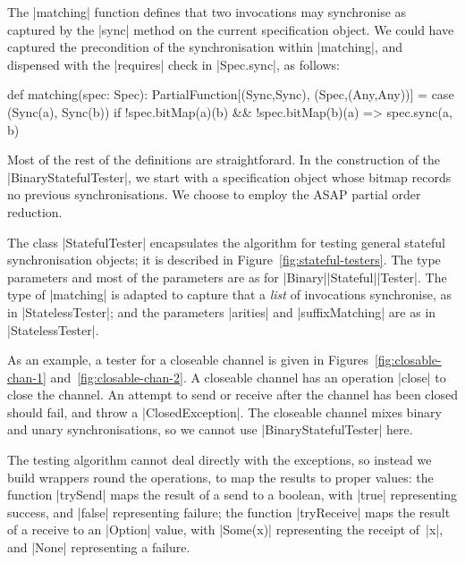 The |matching| function defines that two invocations may synchronise as
captured by the |sync| method on the current specification object.  We could
have captured the precondition of the synchronisation within |matching|, and
dispensed with the |requires| check in |Spec.sync|, as follows:
%
\begin{scala}
  def matching(spec: Spec): PartialFunction[(Sync,Sync), (Spec,(Any,Any))] = {
    case (Sync(a), Sync(b)) if !spec.bitMap(a)(b) && !spec.bitMap(b)(a) => 
      spec.sync(a, b) 
  }
\end{scala}

Most of the rest of the definitions are straightforard.  In the construction
of the |BinaryStatefulTester|, we start with a specification object whose
bitmap records no previous synchronisations.  We choose to employ the ASAP
partial order reduction.



The class |StatefulTester| encapsulates the algorithm for testing general
stateful synchronisation objects; it is described in
Figure~\ref{fig:stateful-testers}.  The type parameters and most of the
parameters are as for |Binary|\-|Stateful|\-|Tester|.  The type of |matching|
is adapted to capture that a \emph{list} of invocations synchronise, as in
|StatelessTester|; and the parameters |arities| and |suffixMatching| are as in
|StatelessTester|.



As an example, a tester for a closeable channel is given in
Figures~\ref{fig:closable-chan-1} and~\ref{fig:closable-chan-2}.  A closeable
channel has an operation |close| to close the channel.  An attempt to send or
receive after the channel has been closed should fail, and throw a
|ClosedException|.  The closeable channel mixes binary and unary
synchronisations, so we cannot use |BinaryStatefulTester| here.

The testing algorithm cannot deal directly with the exceptions, so instead we
build wrappers round the operations, to map the results to proper values: the
function |trySend| maps the result of a send to a boolean, with |true|
representing success, and |false| representing failure; the function
|tryReceive| maps the result of a receive to an |Option| value, with |Some(x)|
representing the receipt of~|x|, and |None| representing a failure.

